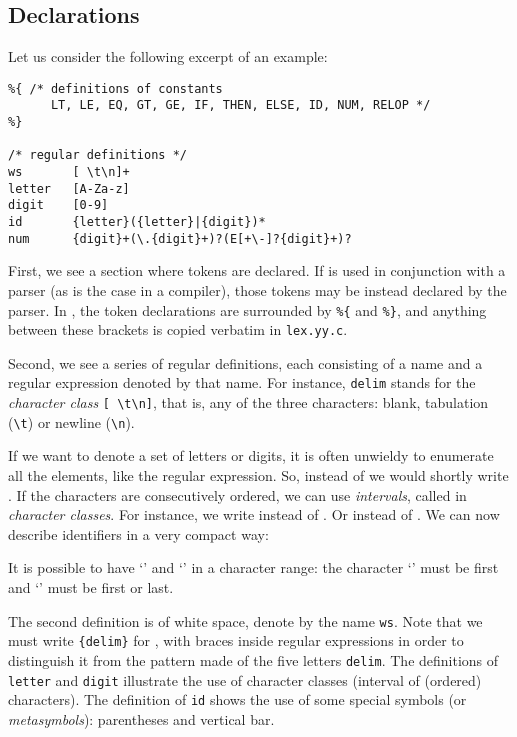 \subsection*{Declarations}

Let us consider the following excerpt of an example:
\begin{verbatim}
%{ /* definitions of constants 
      LT, LE, EQ, GT, GE, IF, THEN, ELSE, ID, NUM, RELOP */
%}

/* regular definitions */
ws       [ \t\n]+
letter   [A-Za-z]
digit    [0-9]
id       {letter}({letter}|{digit})*
num      {digit}+(\.{digit}+)?(E[+\-]?{digit}+)?
\end{verbatim}
First, we see a section where tokens are declared. If \Lex is used in
conjunction with a parser (as is the case in a compiler), those tokens
may be instead declared by the parser. In \Lex, the token declarations
are surrounded by \verb+%{+ and \verb+%}+, and anything between these
brackets is copied verbatim in \texttt{lex.yy.c}.

Second, we see a series of regular definitions, each consisting of a
name and a regular expression denoted by that name. For instance,
\texttt{delim} stands for the \emph{character class} \verb+[ \t\n]+,
that is, any of the three characters: blank, tabulation (\verb+\t+) or
newline (\verb+\n+).

If we want to denote a set of letters or digits, it is often unwieldy
to enumerate all the elements, like the  regular
expression. So, instead of  \disj {} \disj {} we
would shortly write \lb{}\rb. If the characters are
consecutively ordered, we can use \emph{intervals}, called in \Lex
\emph{character classes}. For instance, we write
\lb{}\dash{}\rb{} instead of  \disj {} \disj
{}. Or \lb{}\dash{}\rb{} instead of  \disj
{} \disj {} \disj {} \disj {} \disj {} \disj
{} \disj {} \disj {} \disj {}. We can now describe
identifiers in a very compact way:
\begin{center}
\lb{}\dash{}\dash{}\rb\lb{}\dash{}\dash{}\dash{}\rb\kleene
\end{center}
It is possible to have `\exc{]}' and `\exc{-}' in a character range:
  the character `\exc{]}' must be first and `\exc{-}' must be first or
    last.

The second definition is of white space, denote by the name
\texttt{ws}. Note that we must write \verb+{delim}+ for ,
with braces inside regular expressions in order to distinguish it from
the pattern made of the five letters \verb+delim+. The definitions of
\texttt{letter} and \texttt{digit} illustrate the use of character
classes (interval of (ordered) characters). The definition of
\texttt{id} shows the use of some \Lex special symbols (or
\emph{metasymbols}): parentheses and vertical bar.

